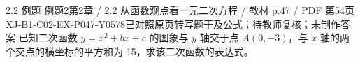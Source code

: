 \par\noindent\begin{minipage}{\linewidth}
\begin{bankitem}{2.2 例题 例题2}{第2章 / 2.2 从函数观点看一元二次方程 / 教材 p.47 / PDF 第54页}{XJ-B1-C02-EX-P047-Y0578}{已对照原页转写题干及公式；待教师复核；未制作答案}
已知二次函数 $y=x^2+bx+c$ 的图象与 $y$ 轴交于点 $A(0,-3)$，与 $x$ 轴的两个交点的横坐标的平方和为 15，求该二次函数的表达式。
\end{bankitem}
\end{minipage}\par\medskip
